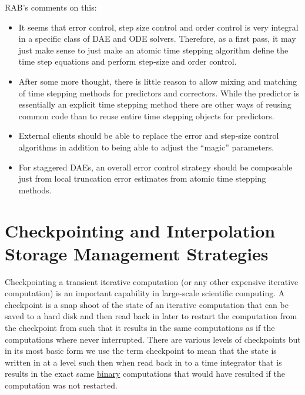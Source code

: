 \documentclass[pdf,ps2pdf,11pt]{SANDreport}
\begin{document}
RAB's comments on this:
\begin{itemize}
%
{}\item It seems that error control, step size control and order control is
very integral in a specific class of DAE and ODE solvers.  Therefore, as a
first pass, it may just make sense to just make an atomic time stepping
algorithm define the time step equations and perform step-size and order
control.
%
{}\item After some more thought, there is little reason to allow mixing and
matching of time stepping methods for predictors and correctors.  While the
predictor is essentially an explicit time stepping method there are other ways
of reusing common code than to reuse entire time stepping objects for
predictors.
%
{}\item External clients should be able to replace the error and step-size
control algorithms in addition to being able to adjust the ``magic''
parameters.
%
{}\item For staggered DAEs, an overall error control strategy should be
composable just from local truncation error estimates from atomic time
stepping methods.
%
\end{itemize}

\section{Checkpointing and Interpolation Storage Management Strategies}

Checkpointing a transient iterative computation (or any other expensive
iterative computation) is an important capability in large-scale scientific
computing.  A checkpoint is a snap shoot of the state of an iterative
computation that can be saved to a hard disk and then read back in later to
restart the computation from the checkpoint from such that it results in the
same computations as if the computations where never interrupted.  There are
various levels of checkpoints but in its most basic form we use the term
checkpoint to mean that the state is written in at a level such then when read
back in to a time integrator that is results in the exact same
{}\underline{binary} computations that would have resulted if the computation
was not restarted.
\end{document}
